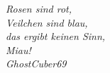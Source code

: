 \documentclass[Thesis.tex]{subfiles}
\begin{document}
\vspace*{\fill}

\begin{center}
  \begin{minipage}{12em}    %
    \raggedright
    \itshape
    Rosen sind rot, \\
    Veilchen sind blau, \\
    das ergibt keinen Sinn, \\
    Miau! \\

    \raggedleft
    \normalfont
    \footnotesize
    GhostCuber69
  \end{minipage}
\end{center}

\vspace*{\fill}

\clearpage
\end{document}
